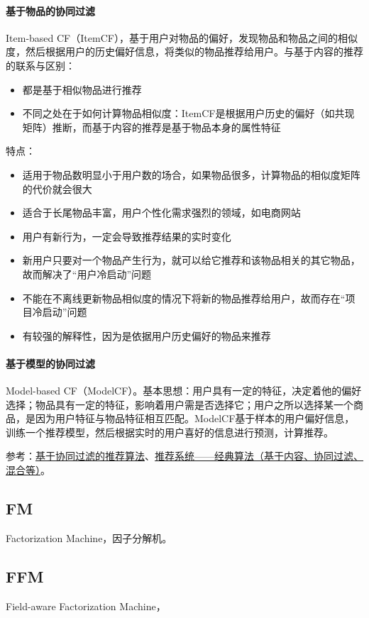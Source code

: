 \paragraph{基于物品的协同过滤}
Item-based CF（ItemCF），基于用户对物品的偏好，发现物品和物品之间的相似度，然后根据用户的历史偏好信息，将类似的物品推荐给用户。与基于内容的推荐的联系与区别：
\begin{itemize}
	\item 都是基于相似物品进行推荐
	\item 不同之处在于如何计算物品相似度：ItemCF是根据用户历史的偏好（如共现矩阵）推断，而基于内容的推荐是基于物品本身的属性特征
\end{itemize}
特点：
\begin{itemize}
	\item 适用于物品数明显小于用户数的场合，如果物品很多，计算物品的相似度矩阵的代价就会很大
	\item 适合于长尾物品丰富，用户个性化需求强烈的领域，如电商网站
	\item 用户有新行为，一定会导致推荐结果的实时变化
	\item 新用户只要对一个物品产生行为，就可以给它推荐和该物品相关的其它物品，故而解决了“用户冷启动”问题
	\item 不能在不离线更新物品相似度的情况下将新的物品推荐给用户，故而存在“项目冷启动”问题
	\item 有较强的解释性，因为是依据用户历史偏好的物品来推荐
\end{itemize}


\paragraph{基于模型的协同过滤}
Model-based CF（ModelCF）。基本思想：用户具有一定的特征，决定着他的偏好选择；物品具有一定的特征，影响着用户需是否选择它；用户之所以选择某一个商品，是因为用户特征与物品特征相互匹配。ModelCF基于样本的用户偏好信息，训练一个推荐模型，然后根据实时的用户喜好的信息进行预测，计算推荐。

参考：\href{https://www.cnblogs.com/shengyang17/p/11516532.html}{基于协同过滤的推荐算法}、\href{https://zhuanlan.zhihu.com/p/108759393}{推荐系统——经典算法（基于内容、协同过滤、混合等）}。




\subsection{FM}
Factorization Machine，因子分解机。

\subsection{FFM}
Field-aware Factorization Machine，